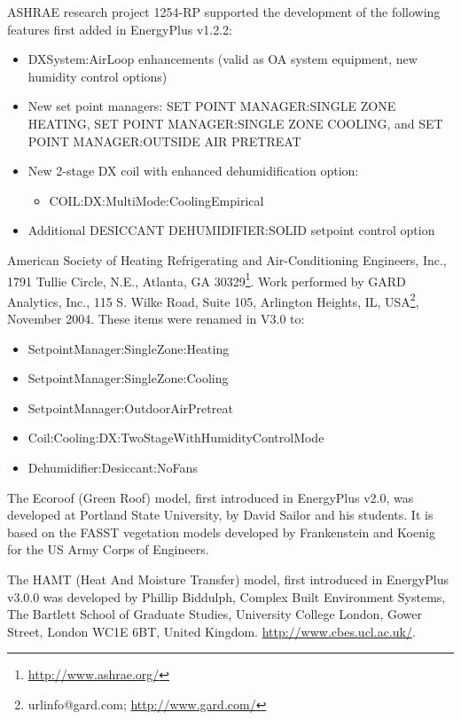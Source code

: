 ASHRAE research project 1254-RP supported the development of the following features first added in EnergyPlus v1.2.2: 
\begin{itemize}
  \item DXSystem:AirLoop enhancements (valid as OA system equipment, new humidity control options)
  \item New set point managers: SET POINT MANAGER:SINGLE ZONE HEATING, SET POINT MANAGER:SINGLE ZONE COOLING, and SET POINT MANAGER:OUTSIDE AIR PRETREAT
  \item New 2-stage DX coil with enhanced dehumidification option:
  \begin{itemize}
  	\item COIL:DX:MultiMode:CoolingEmpirical
  \end{itemize}
  \item Additional DESICCANT DEHUMIDIFIER:SOLID setpoint control option
\end{itemize}

American Society of Heating Refrigerating and Air-Conditioning Engineers, Inc., 1791 Tullie Circle, N.E., Atlanta, GA 30329\footnote{\url{http://www.ashrae.org/}}. Work performed by GARD Analytics, Inc., 115 S. Wilke Road, Suite 105, Arlington Heights, IL, USA\footnote{url{info@gard.com}; \url{http://www.gard.com/}}, November 2004. These items were renamed in V3.0 to:
\begin{itemize}
  \item SetpointManager:SingleZone:Heating
  \item SetpointManager:SingleZone:Cooling
  \item SetpointManager:OutdoorAirPretreat
  \item Coil:Cooling:DX:TwoStageWithHumidityControlMode
  \item Dehumidifier:Desiccant:NoFans
\end{itemize}

The Ecoroof (Green Roof) model, first introduced in EnergyPlus v2.0, was developed at Portland State University, by David Sailor and his students. It is based on the FASST vegetation models developed by Frankenstein and Koenig for the US Army Corps of Engineers.

The HAMT (Heat And Moisture Transfer) model, first introduced in EnergyPlus v3.0.0 was developed by Phillip Biddulph, Complex Built Environment Systems, The Bartlett School of Graduate Studies, University College London, Gower Street, London WC1E 6BT, United Kingdom. \url{http://www.cbes.ucl.ac.uk/}.

